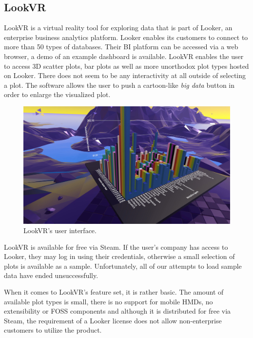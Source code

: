 \documentclass[thesis=M,english,hidelinks]{FITthesisXE}[2012/06/26]
\begin{document}
\subsection{LookVR}

LookVR is a virtual reality tool for exploring data that is part of Looker, an enterprise business analytics platform.\autocite{lookvr} Looker enables its customers to connect to more than 50 types of databases. Their BI platform can be accessed via a web browser, a demo of an example dashboard is available.\autocite{lookerdash} LookVR enables the user to access 3D scatter plots, bar plots as well as more unorthodox plot types hosted on Looker. There does not seem to be any interactivity at all outside of selecting a plot. The software allows the user to push a cartoon-like \emph{big data} button in order to enlarge the visualized plot.

\begin{figure}[ht]
\centering
\includegraphics[scale=0.2]{lookvr}
\caption{LookVR's user interface.\autocite{lookvrsteam}}
\label{fig:lookvr}
\end{figure}

LookVR is available for free via Steam.\autocite{lookvrsteam} If the user's company has access to Looker, they may log in using their credentials, otherwise a small selection of plots is available as a sample. Unfortunately, all of our attempts to load sample data have ended unsuccessfully.

When it comes to LookVR's feature set, it is rather basic. The amount of available plot types is small, there is no support for mobile HMDs, no extensibility or FOSS components and although it is distributed for free via Steam, the requirement of a Looker license does not allow non-enterprise customers to utilize the product.
\end{document}
